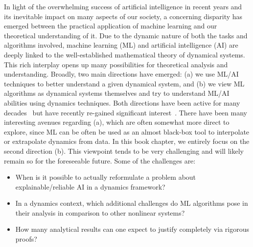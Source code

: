 \documentclass[10pt]{article}
\begin{document}
In light of the overwhelming success of artificial intelligence in recent years and its inevitable impact on many aspects of our society, a concerning disparity has emerged between the practical application of machine learning and our theoretical understanding of it. Due to the dynamic nature of both the tasks and algorithms involved, machine learning (ML) and artificial intelligence (AI) are deeply linked to the well-established mathematical theory of dynamical systems. This rich interplay opens up many possibilities for theoretical analysis and understanding.
Broadly, two main directions have emerged: (a) we use ML/AI techniques to better understand a given dynamical system, and (b) we view ML algorithms as dynamical systems themselves and try to understand ML/AI abilities using dynamics techniques. Both directions have been active for many decades~\cite{FarmerPackardPerelson,Kosko} but have recently re-gained significant interest~\cite{BruntonKutz,Weinan2017}. There have been many interesting avenues regarding (a), which are often somewhat more direct to explore, since ML can be often be used as an almost black-box tool to interpolate or extrapolate dynamics from data. In this book chapter, we entirely focus on the second direction (b). This viewpoint tends to be very challenging and will likely remain so for the foreseeable future. Some of the challenges are:

\begin{itemize}[leftmargin=9mm]
	\item[(C1)] When is it possible to actually reformulate a problem about explainable/reliable AI in a dynamics framework?
	\item[(C2)] In a dynamics context, which additional challenges do ML algorithms pose in their analysis in comparison to other nonlinear systems?
	\item[(C3)] How many analytical results can one expect to justify completely via rigorous proofs?
\end{itemize}
\end{document}
